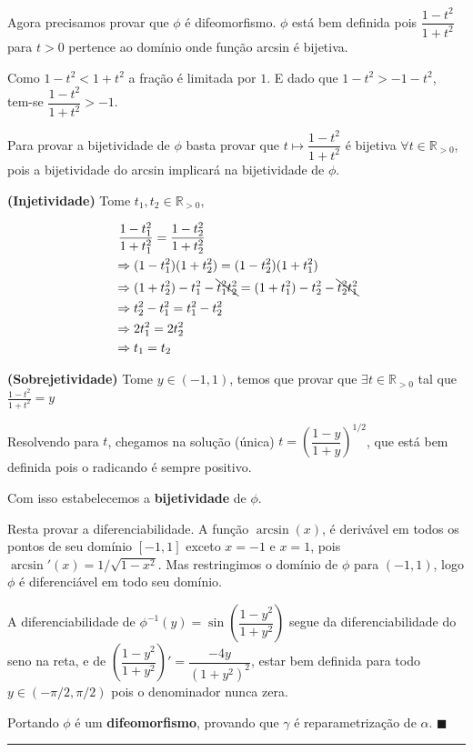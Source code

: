 \documentclass[12pt,letterpaper]{article}
\newcommand{\linesep}{{\color{black} \rule{\linewidth}{0.5mm} }}
\newcommand{\rpos}{\mathbb{R}_{>0}}
\begin{document}
\begin{enumerate}
	Agora precisamos provar que $\phi$ é difeomorfismo. $\phi$ está bem definida pois $\dfrac{1-t^2}{1+t^2}$ para $t>0$ pertence ao domínio onde função arcsin é bijetiva.
	
	Como $1-t^2<1+t^2$ a fração é limitada por $1$. E dado que $1-t^2>-1-t^2$, tem-se $\dfrac{1-t^2}{1+t^2}>-1$.
	
	Para provar a bijetividade de $\phi$ basta provar que $t\mapsto\dfrac{1-t^2}{1+t^2}$ é bijetiva $\forall t \in\rpos$, pois a bijetividade do arcsin implicará na bijetividade de $\phi$.
	
	\textbf{(Injetividade)} Tome $t_1,t_2\in\rpos$,
	
	\begin{align*}
		&~\dfrac{1-t_1^2}{1+t_1^2}=\dfrac{1-t_2^2}{1+t_2^2}\\
		&\Rightarrow (1-t_1^2)(1+t_2^2)=(1-t_2^2)(1+t_1^2)\\
		&\Rightarrow (1+t_2^2)-t_1^2-\bcancel{t_1^2t_2^2}=(1+t_1^2)-t_2^2-\bcancel{t_2^2t_1^2}\\
		&\Rightarrow t_2^2-t_1^2=t_1^2-t_2^2\\
		&\Rightarrow2t_1^2=2t_2^2\\
		&\Rightarrow t_1=t_2
	\end{align*} 

	\textbf{(Sobrejetividade)} Tome $y\in(-1,1)$, temos que provar que $\exists t\in\rpos$ tal que $\frac{1-t^2}{1+t^2}=y$
	
	Resolvendo para $t$, chegamos na solução (única) $t=\left(\dfrac{1-y}{1+y}\right)^{1/2}$, que está bem definida pois o radicando é sempre positivo.
	
	Com isso estabelecemos a \textbf{bijetividade} de $\phi$.
	
	Resta provar a diferenciabilidade. A função $\arcsin(x)$, é derivável em todos os pontos de seu domínio $[-1,1]$ exceto $x=-1$ e $x=1$, pois $\arcsin'(x)=1/\sqrt{1 - x^2}$. Mas restringimos o domínio de $\phi$ para $(-1,1)$, logo $\phi$ é diferenciável em todo seu domínio. 
	
	A diferenciabilidade de $\phi^{-1}(y)=\sin\left(\dfrac{1-y^2}{1+y^2}\right)$ segue da diferenciabilidade do seno na reta, e de $\left(\dfrac{1-y^2}{1+y^2}\right)'=\dfrac{-4y}{(1+y^2)^2}$, estar bem definida para todo $y\in(-\pi/2,\pi/2)$ pois o denominador nunca zera.
	
	Portando $\phi$ é um \textbf{difeomorfismo}, provando que $\gamma$ é reparametrização de $\alpha$. $\blacksquare$
	
	\linesep
		

\end{enumerate}
\end{document}
